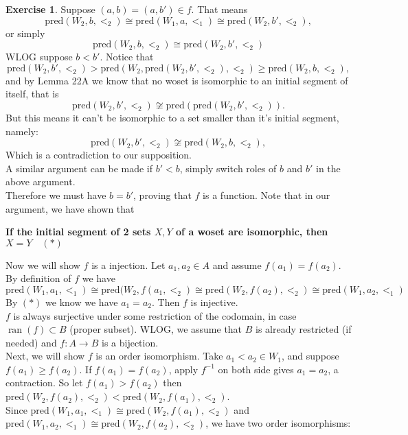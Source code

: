 \documentclass{article}
\theoremstyle{definition}
\newtheorem{exercise}{Exercise}[section]
\begin{document}
\begin{exercise}
        \noindent Suppose $(a, b) = (a, b') \in f$. That means 
        $$\text{pred}(W_2, b, <_2) \cong \text{pred}(W_1, a, <_1) \cong \text{pred}(W_2, b', <_2),$$ 
        or simply 
        $$\text{pred}(W_2, b, <_2) \cong \text{pred}(W_2, b', <_2)$$
        WLOG suppose $b < b'$. Notice that 
        $$\text{pred}(W_2, b', <_2) > \text{pred}(W_2, \text{pred}(W_2, b', <_2), <_2) \geq \text{pred}(W_2, b, <_2),$$ 
        and by Lemma 22A we know that no woset is isomorphic to an initial segment of itself, that is 
        $$\text{pred}(W_2, b', <_2) \not\cong \text{pred}(\text{pred}(W_2, b', <_2)).$$
        But this means it can't be isomorphic to a set smaller than it's initial segment, namely:
        $$\text{pred}(W_2, b', <_2) \not\cong \text{pred}(W_2, b, <_2),$$
        Which is a contradiction to our supposition.\\
        A similar argument can be made if $b' < b$, simply switch roles of $b$ and $b'$ in the above argument. \\
        Therefore we must have $b = b'$, proving that $f$ is a function. Note that in our argument, we have shown that 
        \begin{center}
            \textbf{If the initial segment of 2 sets $X, Y$ of a woset are isomorphic, then $X = Y \quad (\ast)$}
        \end{center}
        Now we will show $f$ is a injection. Let $a_1, a_2 \in A$ and assume $f(a_1) = f(a_2)$. By definition of $f$ we have 
        $$\text{pred}(W_1, a_1, <_1) \cong \text{pred}(W_2, f(a_1, <_2) \cong \text{pred}(W_2, f(a_2), <_2) \cong \text{pred}(W_1, a_2, <_1)$$
        By $(\ast)$ we know we have $a_1 = a_2$. Then $f$ is injective.\\
        $f$ is always surjective under some restriction of the codomain, in case $\operatorname{ran}(f) \subset B$ (proper subset). WLOG, we assume that $B$ is already restricted (if needed) and $f: A \rightarrow B$ is a bijection. \vspace{1em}\\
        Next, we will show $f$ is an order isomorphism. Take $a_1 < a_2 \in W_1$, and suppose $f(a_1) \geq f(a_2)$. If $f(a_1) = f(a_2)$, apply $f^{-1}$ on both side gives $a_1 = a_2$, a contraction. So let $f(a_1) > f(a_2)$ then $\text{pred}(W_2, f(a_2), <_2)  < \text{pred}(W_2, f(a_1), <_2)$.\\
        Since $\text{pred}(W_1, a_1, <_1) \cong \text{pred}(W_2, f(a_1), <_2)$ and $\text{pred}(W_1, a_2, <_1) \cong \text{pred}(W_2, f(a_2), <_2)$, we have two order isomorphisms: 

\end{exercise}
\end{document}
